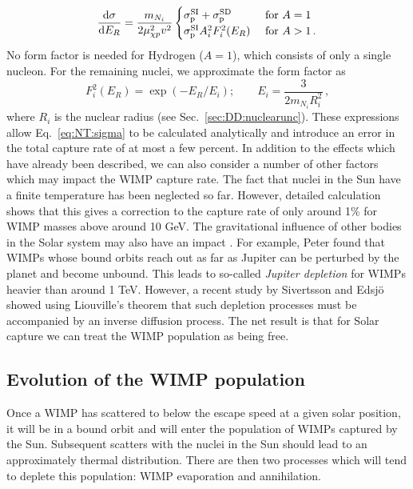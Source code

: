 \begin{equation}
\dbd{\sigma}{E_R} = \frac{m_{N_i}}{2\mu_{\chi p}^2 v^2}
\begin{cases}
\sigmapsi + \sigmapsd & \textrm{ for } A = 1 \\
\sigmapsi A_i^2 F_i^2(E_R) & \textrm{ for } A > 1 \,.
\end{cases}
\end{equation}
No form factor is needed for Hydrogen ($A=1$), which consists of only a single nucleon. For the remaining nuclei, we approximate the form factor as \cite{Gould:1987}
\begin{equation}
F^2_i(E_R) = \exp(-E_R/E_i); \qquad E_i = \frac{3}{2m_{N_i} R_i^2}\,,
\end{equation}
where $R_i$ is the nuclear radius (see Sec.~\ref{sec:DD:nuclearunc}). These expressions allow Eq.~\ref{eq:NT:sigma} to be calculated analytically and introduce an error in the total capture rate of at most a few percent.
In addition to the effects which have already been described, we can also consider a number of other factors which may impact the WIMP capture rate. The fact that nuclei in the Sun have a finite temperature has been neglected so far. However, detailed calculation \cite{Press:1985,Gould:1987} shows that this gives a correction to the capture rate of only around 1\% for WIMP masses above around 10 GeV. The gravitational influence of other bodies in the Solar system may also have an impact \cite{Gould:1991}. For example, Peter \cite{Peter:2009} found that WIMPs whose bound orbits reach out as far as Jupiter can be perturbed by the planet and become unbound. This leads to so-called \textit{Jupiter depletion} for WIMPs heavier than around 1 TeV. However, a recent study by Sivertsson and Edsj\"{o} \cite{Sivertsson:2012} showed using Liouville's theorem that such depletion processes must be accompanied by an inverse diffusion process. The net result is that for Solar capture we can treat the WIMP population as being free.



\subsection{Evolution of the WIMP population}

Once a WIMP has scattered to below the escape speed at a given solar position, it will be in a bound orbit and will enter the population of WIMPs captured by the Sun. Subsequent scatters with the nuclei in the Sun should lead to an approximately thermal distribution. There are then two processes which will tend to deplete this population: WIMP evaporation and annihilation.

